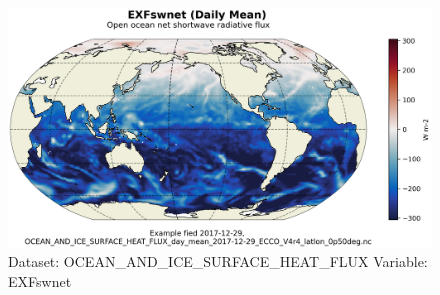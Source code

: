 \begin{figure}[H]
\centering
\includegraphics[scale=0.55]{../images/plots/latlon_plots/Ocean_and_Sea-Ice_Surface_Heat_Fluxes/EXFswnet.png}
\caption{Dataset: OCEAN\_AND\_ICE\_SURFACE\_HEAT\_FLUX Variable: EXFswnet}
\label{tab:table-OCEAN_AND_ICE_SURFACE_HEAT_FLUX_EXFswnet-Plot}
\end{figure}
\pagebreak
